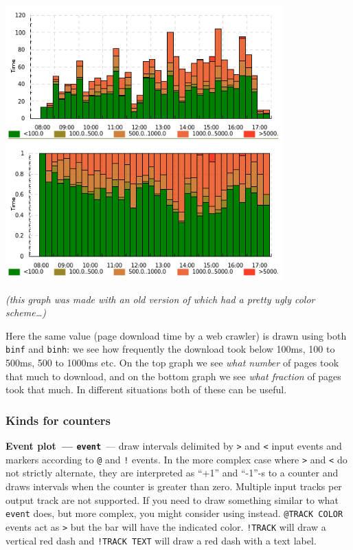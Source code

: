 \documentclass{article}
\begin{document}
\centerline{\includegraphics[width=0.8\textwidth]{pics/tplot/binf-binh.png}}

\emph{(this graph was made with an old version of \timeplot{} which had a pretty ugly color scheme\ldots)}

Here the same value (page download time by a web crawler) is drawn using both \texttt{binf} and \texttt{binh}: we see how frequently the download took below 100ms, 100 to 500ms, 500 to 1000ms etc. On the top graph we see \emph{what number} of pages took that much to download, and on the bottom graph we see \emph{what fraction} of pages took that much. In different situations both of these can be useful.

\pagebreak
\subsubsection{Kinds for counters}
\noindent
\textbf{Event plot~--- \texttt{event}}~--- draw intervals delimited by \texttt{>} and \texttt{<} input events and markers according to \texttt{@} and \texttt{!} events. In the more complex case where \texttt{>} and \texttt{<} do not strictly alternate, they are interpreted as ``+1'' and ``-1''-s to a counter and \timeplot{} draws intervals when the counter is greater than zero. Multiple input tracks per output track are not supported. If you need to draw something similar to what \texttt{event} does, but more complex, you might consider using \splot{} instead. \texttt{@TRACK COLOR} events act as \texttt{>} but the bar will have the indicated color. \texttt{!TRACK} will draw a vertical red dash and \texttt{!TRACK TEXT} will draw a red dash with a text label. 
\end{document}
